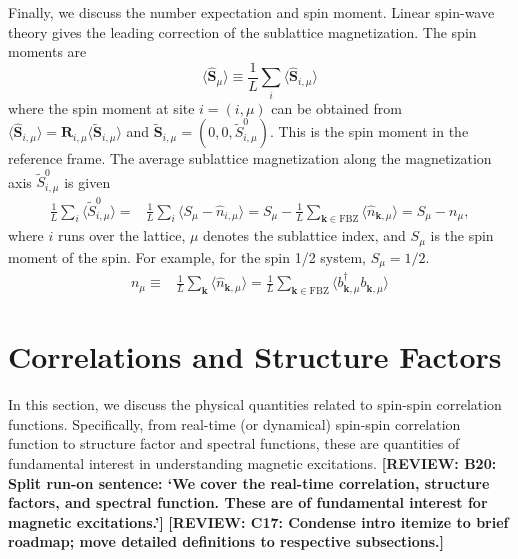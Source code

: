 \documentclass[aps, prx, nofootinbib, superscriptaddress]{revtex4-2}
\newcommand{\REVIEW}[1]{{\color{reviewcolor}\bfseries [REVIEW: #1]}}
\newcommand{\kvec}{\mathbf{k}}
\begin{document}
Finally, we discuss the number expectation and spin moment. 
Linear spin-wave theory gives the leading correction of the sublattice magnetization. 
The spin moments are 
\begin{equation}
    \langle \hat{\mathbf{S}}_{\mu} \rangle 
    \equiv \frac{1}{L} \sum_{i} \langle \hat{\mathbf{S}}_{i, \mu} \rangle
\end{equation}
where the spin moment at site $i=(i,\mu)$ can be obtained from $\langle \hat{\mathbf{S}}_{i, \mu} \rangle = \mathbf{R}_{i,\mu} \langle \widetilde{\mathbf{S}}_{i,\mu} \rangle$ and $\widetilde{\mathbf{S}}_{i,\mu} = (0, 0, \widetilde{S}^{0}_{i,\mu})$. 
This is the spin moment in the reference frame.
The average sublattice magnetization along the magnetization axis $\widetilde{S}^{0}_{i,\mu}$ is given
\begin{align*}
    \frac{1}{L} \sum_{i} \langle \widetilde{S}^{0}_{i, \mu} \rangle 
    = & \frac{1}{L} \sum_{i} \langle S_{\mu} -  \hat{n}_{i, \mu} \rangle 
    = S_{\mu} - \frac{1}{L} \sum_{\kvec \in \mathrm{FBZ}}  \langle \hat{n}_{\kvec, \mu}  \rangle
    = S_{\mu} - n_{\mu},
\end{align*}
where $i$ runs over the lattice, $\mu$ denotes the sublattice index, and $S_{\mu}$ is the spin moment of the spin. 
For example, for the spin 1/2 system, $S_\mu = 1/2$.
\begin{align}
    n_{\mu} \equiv & \frac{1}{L} \sum_{\kvec}  \langle \hat{n}_{\kvec, \mu} \rangle
    = \frac{1}{L} \sum_{\kvec \in \mathrm{FBZ}}
    \langle b^{\dagger}_{\kvec, \mu} b_{\kvec, \mu}^{\phantom \dagger} \rangle
\end{align}


\section{Correlations and Structure Factors}

In this section, we discuss the physical quantities related to spin-spin correlation functions. Specifically, from real-time (or dynamical) spin-spin correlation function to structure factor and spectral functions, these are quantities of fundamental interest in understanding magnetic excitations.
\REVIEW{B20: Split run-on sentence: `We cover the real-time correlation, structure factors, and spectral function. These are of fundamental interest for magnetic excitations.'}
\REVIEW{C17: Condense intro itemize to brief roadmap; move detailed definitions to respective subsections.}
\end{document}

